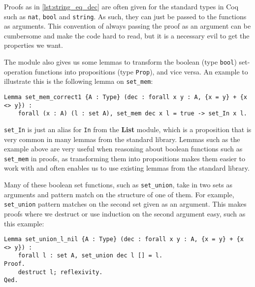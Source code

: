 Proofs as in \autoref{lst:string_eq_dec} are often given for the standard types in Coq such as \lstinline{nat},
\lstinline{bool} and \lstinline{string}.
As such, they can just be passed to the functions as arguments.
This convention of always passing the proof as an argument can be cumbersome and make the code hard to read,
but it is a necessary evil to get the properties we want.

The module also gives us some lemmas to transform the boolean (type \lstinline{bool}) set-operation functions into
propositions (type \lstinline{Prop}), and vice versa. An example to illustrate this is the following lemma on \lstinline{set_mem}:

\begin{minipage}{\linewidth}
\begin{lstlisting}[language=Coq, label={lst:set_mem_correct1}, caption={\lstinline{set_mem} lemma from \lstinline{ListSet}}]
Lemma set_mem_correct1 {A : Type} (dec : forall x y : A, {x = y} + {x <> y}) :
    forall (x : A) (l : set A), set_mem dec x l = true -> set_In x l.
\end{lstlisting}
\end{minipage}

\lstinline{set_In} is just an alias for \lstinline{In} from the \textbf{List} module,
which is a proposition that is very common in many lemmas from the standard library.
Lemmas such as the example above are very useful when reasoning about boolean functions such as
\lstinline{set_mem} in proofs, as transforming them into propositions makes them easier to work with
and often enables us to use existing lemmas from the standard library.

Many of these boolean set functions, such as \lstinline{set_union},
take in two sets as arguments and pattern match on the structure of one of them.
For example, \lstinline{set_union} pattern matches on the second set given as an argument.
This makes proofs where we destruct or use induction on the second argument easy, such as this example:

\begin{minipage}{\linewidth}
\begin{lstlisting}[language=Coq, label={lst:set_op_ex1}, caption={Easy proof of lemma in \lstinline{ListSet}}]
Lemma set_union_l_nil {A : Type} (dec : forall x y : A, {x = y} + {x <> y}) :
    forall l : set A, set_union dec l [] = l.
Proof.
    destruct l; reflexivity.
Qed.
\end{lstlisting}
\end{minipage}

